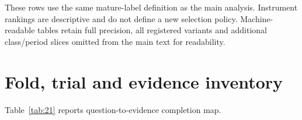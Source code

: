 \documentclass[11pt,a4paper]{article}
\begin{document}


These rows use the same mature-label definition as the main analysis. Instrument rankings are descriptive and do not define a new selection policy. Machine-readable tables retain full precision, all registered variants and additional class/period slices omitted from the main text for readability.


\section{Fold, trial and evidence inventory}\label{sec:appendix-b}

\noindent Table~\ref{tab:21} reports question-to-evidence completion map.
\end{document}
